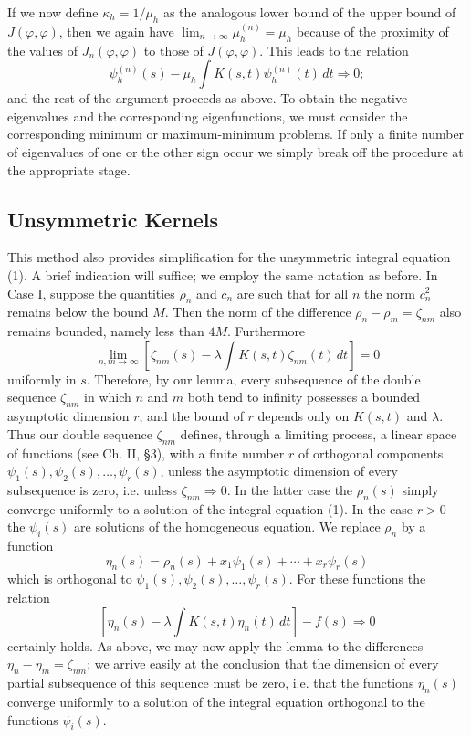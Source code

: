 If we now define $\kappa_h=1/\mu_h$ as the analogous lower bound of the upper bound of $J(\varphi,\varphi)$, then we again have $\lim_{n\to\infty}\mu_h^{(n)}=\mu_h$ because of the proximity of the values of $J_n(\varphi,\varphi)$ to those of $J(\varphi,\varphi)$. This leads to the relation
\[
\psi_h^{(n)}(s)-\mu_h\int K(s,t)\psi_h^{(n)}(t)\,dt\Rightarrow0;
\]
and the rest of the argument proceeds as above. To obtain the negative eigenvalues and the corresponding eigenfunctions, we must consider the corresponding minimum or maximum-minimum problems. If only a finite number of eigenvalues of one or the other sign occur we simply break off the procedure at the appropriate stage.

\subsection{Unsymmetric Kernels}
This method also provides simplification for the unsymmetric integral equation (1). A brief indication will suffice; we employ the same notation as before. In Case I, suppose the quantities $\rho_n$ and $c_n$ are such that for all $n$ the norm $c_n^2$ remains below the bound $M$. Then the norm of the difference $\rho_n-\rho_m=\zeta_{nm}$ also remains bounded, namely less than $4M$. Furthermore
\[
\lim_{n,m\to\infty}\left[\zeta_{nm}(s)-\lambda\int K(s,t)\zeta_{nm}(t)\,dt\right]=0
\]
uniformly in $s$. Therefore, by our lemma, every subsequence of the double sequence $\zeta_{nm}$ in which $n$ and $m$ both tend to infinity possesses a bounded asymptotic dimension $r$, and the bound of $r$ depends only on $K(s,t)$ and $\lambda$. Thus our double sequence $\zeta_{nm}$ defines, through a limiting process, a linear space of functions (see Ch. II, \S3), with a finite number $r$ of orthogonal components $\psi_1(s),\psi_2(s),\ldots,\psi_r(s)$, unless the asymptotic dimension of every subsequence is zero, i.e. unless $\zeta_{nm}\Rightarrow0$. In the latter case the $\rho_n(s)$ simply converge uniformly to a solution of the integral equation (1). In the case $r>0$ the $\psi_i(s)$ are solutions of the homogeneous equation. We replace $\rho_n$ by a function
\[
\eta_n(s)=\rho_n(s)+x_1\psi_1(s)+\cdots+x_r\psi_r(s)
\]
which is orthogonal to $\psi_1(s),\psi_2(s),\ldots,\psi_r(s)$. For these functions the relation
\[
\left[\eta_n(s)-\lambda\int K(s,t)\eta_n(t)\,dt\right]-f(s)\Rightarrow0
\]
certainly holds. As above, we may now apply the lemma to the differences $\eta_n-\eta_m=\zeta_{nm}$; we arrive easily at the conclusion that the dimension of every partial subsequence of this sequence must be zero, i.e. that the functions $\eta_n(s)$ converge uniformly to a solution of the integral equation orthogonal to the functions $\psi_i(s)$.

